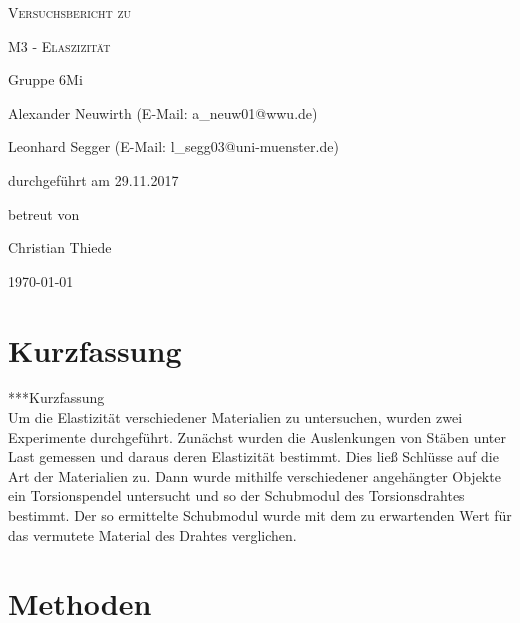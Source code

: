 \documentclass[
	a4paper,
	12pt,
	pagesize,
	ngerman
]{scrartcl}
\begin{document}
	
	\begin{titlepage}
		\centering
		{\scshape\LARGE Versuchsbericht zu \par}
		\vspace{1cm}
		{\scshape\huge M3 - Elaszizität\par}
		\vspace{2.5cm}
		{\LARGE Gruppe 6Mi \par}
		\vspace{0.5cm}
		
		{\large Alexander Neuwirth (E-Mail: a\_neuw01@wwu.de) \par}
		{\large Leonhard Segger (E-Mail: l\_segg03@uni-muenster.de) \par}
		\vfill
		
		durchgeführt am 29.11.2017\par
		betreut von\par
		{\large Christian Thiede}
		
		\vfill
		
		{\large \today\par}
	\end{titlepage}
	\tableofcontents
	\newpage
	
	\section{Kurzfassung}
	***Kurzfassung\\
	Um die Elastizität verschiedener Materialien zu untersuchen, wurden zwei Experimente durchgeführt. Zunächst wurden die Auslenkungen von Stäben unter Last gemessen und daraus deren Elastizität bestimmt. Dies ließ Schlüsse auf die Art der Materialien zu. Dann wurde mithilfe verschiedener angehängter Objekte ein Torsionspendel untersucht und so der Schubmodul des Torsionsdrahtes bestimmt.  %
	Der so ermittelte Schubmodul wurde mit dem zu erwartenden Wert für das vermutete Material des Drahtes verglichen.

	\section{Methoden}
	
\end{document}
